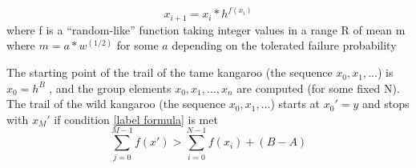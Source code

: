 \documentclass[12pt]{article}
\begin{document}
$$x_{i+1}=x_i*h^{f(x_i)}$$ 
\hspace*{1.5mm}where f is a “random-like” function taking integer values in a range R of mean m
\newline
\hspace*{3mm} where $m=a*w^{(1/2)}$ for some $a$ depending on the tolerated failure probability 
\newline

The starting point of the trail of the tame kangaroo (the sequence $x_0,x_1,...$) is $x_0= h^B$ , and the group elements $x_0,x_1,...,x_n$ are computed (for some fixed N). The trail of the wild kangaroo (the sequence $x_0,x_1,...$) starts at $x_0'=y$  and stops with $x_M'$ if condition \ref{label formula} is met
\begin{equation}
\label{label formula}
 \sum\limits_{j=0}^{M-1} f(x') > \sum\limits_{i=0}^{N-1} f(x_i) + (B - A)   
\end{equation}
\end{document}
